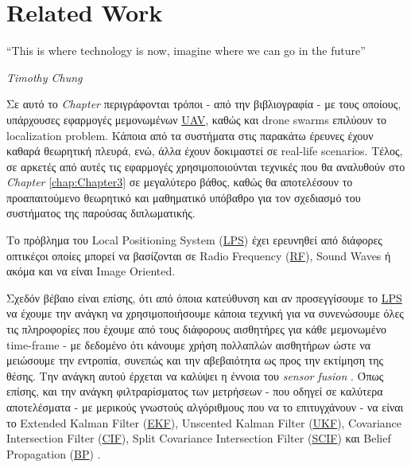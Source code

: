 \chapter{Related Work} \label{chap:Chapter2}       
\epigraph{``This is where technology is now, imagine where we can go in the future” }{\textit{Timothy Chung}}

Σε αυτό το \emph{Chapter} περιγράφονται τρόποι - από την βιβλιογραφία - με τους οποί\-ους, υπάρχουσες εφαρμογές 
μεμονωμένων \hyperref[abbr:UAV]{UAV}, καθώς και drone swarms επιλύουν το localization pro\-blem. Κάποια από τα συστήματα στις παρακάτω έρευνες έχουν καθαρά
θεωρητική πλευρά, ενώ, άλλα έχουν δοκιμαστεί σε real-life scenarios.
Τέλος, σε α\-ρκε\-τές από αυτές τις εφαρμογές χρησιμοποιούνται τεχνικές που θα αναλυθούν στο \emph{Chapter} \ref{chap:Chapter3} 
σε μεγαλύτερο βάθος, καθώς θα αποτελέσουν το προαπαιτούμενο θεωρητικό και μαθηματικό υπόβαθρο για τον σχεδιασμό του συστήματος της παρούσας διπλωματικής.


Το πρόβλημα του Local Positioning System 
(\hyperref[abbr:LPS]{LPS}) \cite{lps} έχει ερευνηθεί από διάφορες οπτικές\udot οι οποίες μπορεί να βασίζονται σε Radio Frequency
(\hyperref[abbr:RF]{RF}), Sound Waves ή ακόμα και να είναι Image Oriented.

Σχεδόν βέβαιο είναι επίσης, ότι από όποια κατεύθυνση και αν προσεγγίσουμε το \hyperref[abbr:LPS]{LPS} να έχουμε την ανάγκη να 
χρησιμοποιήσουμε κάποια τεχνική για να συνενώσουμε όλες τις πληροφορίες που έχουμε από τους διάφορους αισθητήρες για κάθε μεμονωμένο 
time-frame - με δεδομένο ότι κάνουμε χρήση πολλαπλών αισθητήρων ώστε να μειώσουμε την εντροπία, συνεπώς και την αβεβαιότητα ως 
προς την εκτίμηση της θέσης. 
Την ανάγκη αυτού έρχεται να καλύψει η έννοια του \emph{sensor fusion} \cite{sensor-fusion}. Όπως επίσης,  
και την ανάγκη φιλτραρίσματος των μετρήσεων - που οδηγεί σε καλύτερα αποτε\-λέ\-σμα\-τα - με μερικούς γνωστούς 
αλγόριθμους που να το επιτυγχάνουν - να είναι το  
Extended Kalman Filter (\hyperref[abbr:EKF]{EKF}), Unscented Kalman Filter (\hyperref[abbr:UKF]{UKF}), Covariance Intersection  
Filter (\hyperref[abbr:CIF]{CIF}),  Split  Covariance  Intersection  Filter (\hyperref[abbr:SCIF]{SCIF}) και  Belief  Propagation 
(\hyperref[abbr:BP]{BP}) \cite{fusion-filters}. 

